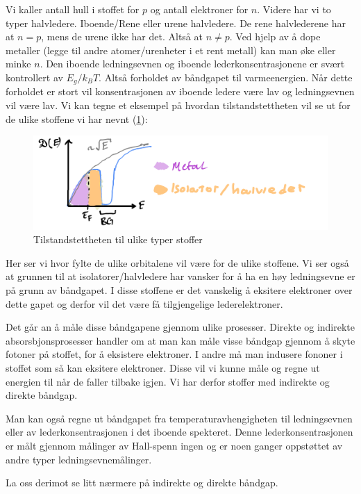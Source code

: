 \documentclass{article}
\begin{document}
Vi kaller antall hull i stoffet for $p$ og antall elektroner for $n$. Videre har vi to typer halvledere. Iboende/Rene eller urene halvledere. De rene halvlederene har at $n = p$, mens de urene ikke har det. Altså at $n \ne p$. Ved hjelp av å dope metaller (legge til andre atomer/urenheter i et rent metall) kan man øke eller minke $n$.
Den iboende ledningsevnen og iboende lederkonsentrasjonene er svært kontrollert av $E_g / k_B T$. Altså forholdet av båndgapet til varmeenergien. Når dette forholdet er stort vil konsentrasjonen av iboende ledere være lav og ledningsevnen vil være lav. Vi kan tegne et eksempel på hvordan tilstandstettheten vil se ut for de ulike stoffene vi har nevnt (\ref{fig:tilstandstetthet_metaller_isolatorer_osv}):
\begin{figure}[H]
    \centering
    \includegraphics[width=0.5\linewidth]{bilder/tilstandstetthet_metaller_isolatorer_osv.png}
    \caption{Tilstandstettheten til ulike typer stoffer}
    \label{fig:tilstandstetthet_metaller_isolatorer_osv}
\end{figure}
Her ser vi hvor fylte de ulike orbitalene vil være for de ulike stoffene. Vi ser også at grunnen til at isolatorer/halvledere har vansker for å ha en høy ledningsevne er på grunn av båndgapet. I disse stoffene er det vanskelig å eksitere elektroner over dette gapet og derfor vil det være få tilgjengelige lederelektroner.

Det går an å måle disse båndgapene gjennom ulike prosesser. Direkte og indirekte absorsbjonsprosesser handler om at man kan måle visse båndgap gjennom å skyte fotoner på stoffet, for å eksistere elektroner. I andre må man indusere fononer i stoffet som så kan eksitere elektroner. Disse vil vi kunne måle og regne ut energien til når de faller tilbake igjen. Vi har derfor stoffer med indirekte og direkte båndgap.

Man kan også regne ut båndgapet fra temperaturavhengigheten til ledningsevnen eller av lederkonsentrasjonen i det iboende spekteret. Denne lederkonsentrasjonen er målt gjennom målinger av Hall-spenn ingen og er noen ganger oppstøttet av andre typer ledningsevnemålinger.

La oss derimot se litt nærmere på indirekte og direkte båndgap.
\end{document}
